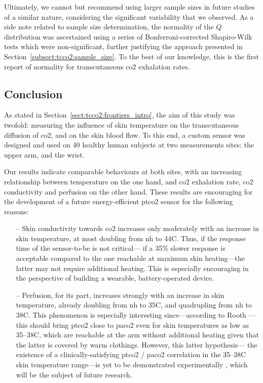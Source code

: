Ultimately, we cannot but recommend using larger sample sizes in future studies of a similar nature, considering the significant variability that we observed. As a side note related to sample size determination, the normality of the $Q$ distribution was ascertained using a series of Bonferroni-corrected Shapiro-Wilk tests which were non-significant, further justifying the approach presented in Section~\ref{subsect:tcco2:sample_size}. To the best of our knowledge, this is the first report of normality for transcutaneous \gls{co2} exhalation rates.

\subsection{Conclusion}\label{sect:conclusion}

As stated in Section~\ref{sect:tcco2:frontiers_intro}, the aim of this study was twofold: measuring the influence of skin temperature on the transcutaneous diffusion of \gls{co2}, and on the skin blood flow. To this end, a custom sensor was designed and used on 40 healthy human subjects at two measurements sites: the upper arm, and the wrist.

Our results indicate comparable behaviours at both sites, with an increasing relationship between temperature on the one hand, and \gls{co2} exhalation rate, \gls{co2} conductivity and perfusion on the other hand. These results are encouraging for the development of a future energy-efficient \gls{ptco2} sensor for the following reasons:

\begin{itemize}
	\item[--] Skin conductivity towards \gls{co2} increases only moderately with an increase in skin temperature, at most doubling from \gls{nh} to 44{\degree}C. Thus, if the response time of the sensor-to-be is not critical---\ie{} if a 35\% slower response is acceptable compared to the one reachable at maximum skin heating---the latter may not require additional heating. This is especially encouraging in the perspective of building a wearable, battery-operated device.
	\item[--] Perfusion, for its part, increases strongly with an increase in skin temperature, already doubling from \gls{nh} to 35{\degree}C, and quadrupling from \gls{nh} to 38{\degree}C. This phenomenon is especially interesting since---according to Rooth \etal{}\cite{rooth1987}---this should bring \gls{ptco2} close to \gls{paco2} even for skin temperatures as low as 35--38{\degree}C, which are reachable at the arm without additional heating given that the latter is covered by warm clothings. \mfrin{}However, this latter hypothesis---\ie{} the existence of a clinically-satisfying \gls{ptco2} / \gls{paco2} correlation in the 35--38{\degree}C skin temperature range---is yet to be demonstrated experimentally \invivo{}, which will be the subject of future research.
\end{itemize}

